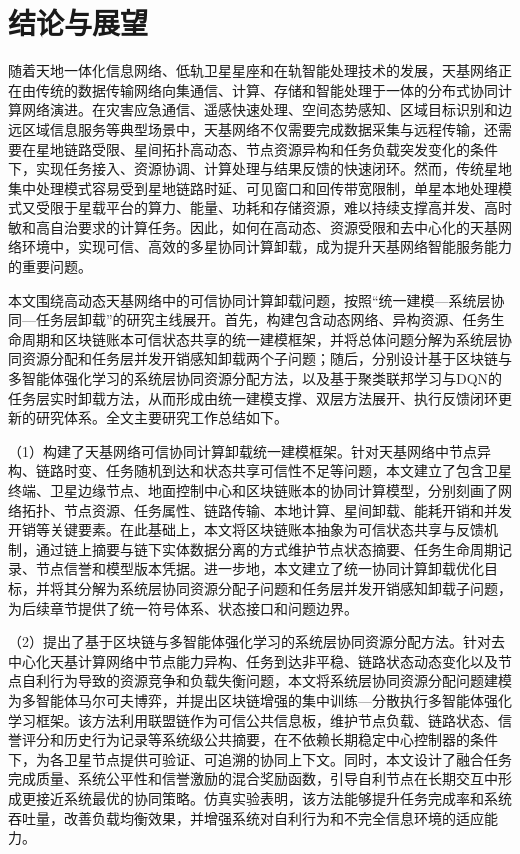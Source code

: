 
\chapter{结论与展望}
\label{chap:conclusion}

随着天地一体化信息网络、低轨卫星星座和在轨智能处理技术的发展，天基网络正在由传统的数据传输网络向集通信、计算、存储和智能处理于一体的分布式协同计算网络演进。在灾害应急通信、遥感快速处理、空间态势感知、区域目标识别和边远区域信息服务等典型场景中，天基网络不仅需要完成数据采集与远程传输，还需要在星地链路受限、星间拓扑高动态、节点资源异构和任务负载突发变化的条件下，实现任务接入、资源协调、计算处理与结果反馈的快速闭环。然而，传统星地集中处理模式容易受到星地链路时延、可见窗口和回传带宽限制，单星本地处理模式又受限于星载平台的算力、能量、功耗和存储资源，难以持续支撑高并发、高时敏和高自治要求的计算任务。因此，如何在高动态、资源受限和去中心化的天基网络环境中，实现可信、高效的多星协同计算卸载，成为提升天基网络智能服务能力的重要问题。

本文围绕高动态天基网络中的可信协同计算卸载问题，按照“统一建模—系统层协同—任务层卸载”的研究主线展开。首先，构建包含动态网络、异构资源、任务生命周期和区块链账本可信状态共享的统一建模框架，并将总体问题分解为系统层协同资源分配和任务层并发开销感知卸载两个子问题；随后，分别设计基于区块链与多智能体强化学习的系统层协同资源分配方法，以及基于聚类联邦学习与DQN的任务层实时卸载方法，从而形成由统一建模支撑、双层方法展开、执行反馈闭环更新的研究体系。全文主要研究工作总结如下。

（1）构建了天基网络可信协同计算卸载统一建模框架。针对天基网络中节点异构、链路时变、任务随机到达和状态共享可信性不足等问题，本文建立了包含卫星终端、卫星边缘节点、地面控制中心和区块链账本的协同计算模型，分别刻画了网络拓扑、节点资源、任务属性、链路传输、本地计算、星间卸载、能耗开销和并发开销等关键要素。在此基础上，本文将区块链账本抽象为可信状态共享与反馈机制，通过链上摘要与链下实体数据分离的方式维护节点状态摘要、任务生命周期记录、节点信誉和模型版本凭据。进一步地，本文建立了统一协同计算卸载优化目标，并将其分解为系统层协同资源分配子问题和任务层并发开销感知卸载子问题，为后续章节提供了统一符号体系、状态接口和问题边界。

（2）提出了基于区块链与多智能体强化学习的系统层协同资源分配方法。针对去中心化天基计算网络中节点能力异构、任务到达非平稳、链路状态动态变化以及节点自利行为导致的资源竞争和负载失衡问题，本文将系统层协同资源分配问题建模为多智能体马尔可夫博弈，并提出区块链增强的集中训练—分散执行多智能体强化学习框架。该方法利用联盟链作为可信公共信息板，维护节点负载、链路状态、信誉评分和历史行为记录等系统级公共摘要，在不依赖长期稳定中心控制器的条件下，为各卫星节点提供可验证、可追溯的协同上下文。同时，本文设计了融合任务完成质量、系统公平性和信誉激励的混合奖励函数，引导自利节点在长期交互中形成更接近系统最优的协同策略。仿真实验表明，该方法能够提升任务完成率和系统吞吐量，改善负载均衡效果，并增强系统对自利行为和不完全信息环境的适应能力。

